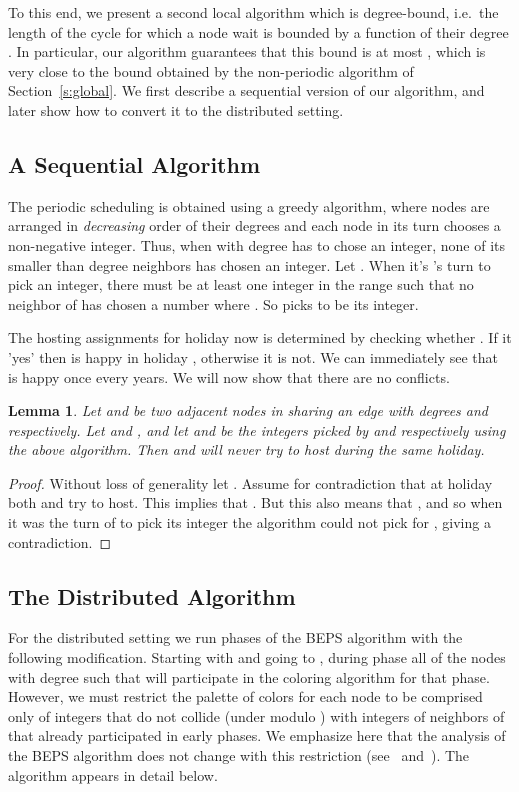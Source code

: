 \documentclass[11pt]{article}
\newtheorem{lemma}[theorem]{Lemma}
\begin{document}
To this end, we present a second local algorithm which is degree-bound, i.e.\ the length of the cycle for which a node  wait is bounded by a function of their degree . In particular, our algorithm guarantees that this bound is at most , which is very close to the bound  obtained by the non-periodic algorithm of Section~\ref{s:global}. We first describe a sequential version of our algorithm, and later show how to convert it to the distributed setting.

\subsection{A Sequential Algorithm}
The periodic scheduling is obtained using a greedy algorithm, where nodes are arranged in {\em decreasing} order of their degrees and each node  in its turn chooses a non-negative integer. Thus, when  with degree  has to chose an integer, none of its smaller than degree  neighbors has chosen an integer. Let . When it's 's turn to pick an integer, there must be at least one integer  in the range  such that no neighbor of  has chosen a number  where . So  picks  to be its integer.

The hosting assignments for holiday  now is determined by checking whether . If it 'yes' then  is happy in holiday , otherwise it is not. We can immediately see that  is happy once every  years. We will now show that there are no conflicts.

\begin{lemma}\label{lemma:sequential_degree_bound}
Let  and  be two adjacent nodes in  sharing an edge with degrees  and  respectively. Let  and , and let  and  be the integers picked by  and  respectively using the above algorithm. Then  and  will never try to host during the same holiday.
\end{lemma}
\begin{proof}

Without loss of generality let . Assume for contradiction that at holiday  both  and  try to host. This implies that . But this also means that , and so when it was the turn of  to pick its integer the algorithm could not pick  for , giving a contradiction.
\end{proof}


\subsection{The Distributed Algorithm}
For the distributed setting we run  phases of the BEPS algorithm with the following modification. Starting with  and going to , during phase  all of the nodes with degree  such that  will participate in the coloring algorithm for that phase. However, we must restrict the palette of colors for each node  to be comprised only of integers that do not collide (under modulo ) with integers of neighbors of  that already participated in early phases. We emphasize here that the analysis of the BEPS algorithm does not change with this restriction (see~\cite{BEPS12} and~\cite{Johansson99}). The algorithm appears in detail below.
\end{document}
